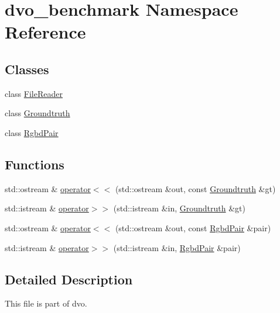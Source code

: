 \hypertarget{namespacedvo__benchmark}{}\section{dvo\+\_\+benchmark Namespace Reference}
\label{namespacedvo__benchmark}
\subsection*{Classes}
\begin{DoxyCompactItemize}
\item 
class \mbox{\hyperlink{classdvo__benchmark_1_1_file_reader}{File\+Reader}}
\item 
class \mbox{\hyperlink{classdvo__benchmark_1_1_groundtruth}{Groundtruth}}
\item 
class \mbox{\hyperlink{classdvo__benchmark_1_1_rgbd_pair}{Rgbd\+Pair}}
\end{DoxyCompactItemize}
\subsection*{Functions}
\begin{DoxyCompactItemize}
\item 
std\+::ostream \& \mbox{\hyperlink{namespacedvo__benchmark_a0f344cbdf74589f265c2f5737bf6e8a7}{operator$<$$<$}} (std\+::ostream \&out, const \mbox{\hyperlink{classdvo__benchmark_1_1_groundtruth}{Groundtruth}} \&gt)
\item 
std\+::istream \& \mbox{\hyperlink{namespacedvo__benchmark_aedfecf76a9e5dbf147f6301c8bd33749}{operator$>$$>$}} (std\+::istream \&in, \mbox{\hyperlink{classdvo__benchmark_1_1_groundtruth}{Groundtruth}} \&gt)
\item 
std\+::ostream \& \mbox{\hyperlink{namespacedvo__benchmark_a0cdc475ab077a0175cd964d248b532ed}{operator$<$$<$}} (std\+::ostream \&out, const \mbox{\hyperlink{classdvo__benchmark_1_1_rgbd_pair}{Rgbd\+Pair}} \&pair)
\item 
std\+::istream \& \mbox{\hyperlink{namespacedvo__benchmark_aff4ff9a1b5ebd5946a3018867e76968b}{operator$>$$>$}} (std\+::istream \&in, \mbox{\hyperlink{classdvo__benchmark_1_1_rgbd_pair}{Rgbd\+Pair}} \&pair)
\end{DoxyCompactItemize}


\subsection{Detailed Description}
This file is part of dvo.

